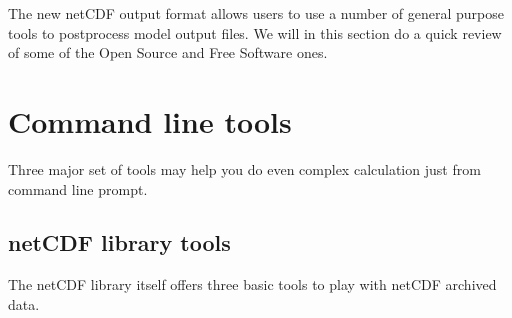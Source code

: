 %
%

The new netCDF output format allows users to use a number of general purpose
tools to postprocess model output files. We will in this section do a quick
review of some of the Open Source and Free Software ones.

\section{Command line tools}

Three major set of tools may help you do even complex calculation just from
command line prompt. 

\subsection{netCDF library tools}

The netCDF library itself offers three basic tools to play with netCDF
archived data.

